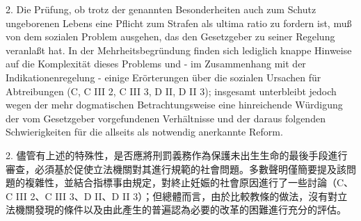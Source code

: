 \documentclass[12pt]{article}
\begin{document}
\syncleft
\begin{sourcepara}
2. Die Prüfung, ob trotz der genannten Besonderheiten auch zum Schutz ungeborenen Lebens eine Pflicht zum Strafen als ultima ratio zu fordern ist, muß von dem sozialen Problem ausgehen, das den Gesetzgeber zu seiner Regelung veranlaßt hat. In der Mehrheitsbegründung finden sich lediglich knappe Hinweise auf die Komplexität dieses Problems und - im Zusammenhang mit der Indikationenregelung - einige Erörterungen über die sozialen Ursachen für Abtreibungen (C, C III 2, C III 3, D II, D II 3); insgesamt unterbleibt jedoch wegen der mehr dogmatischen Betrachtungsweise eine hinreichende Würdigung der vom Gesetzgeber vorgefundenen Verhältnisse und der daraus folgenden Schwierigkeiten für die allseits als notwendig anerkannte Reform.
\end{sourcepara}
\begin{transpara}
2. 儘管有上述的特殊性，是否應將刑罰義務作為保護未出生生命的最後手段進行審查，必須基於促使立法機關對其進行規範的社會問題。多數聲明僅簡要提及該問題的複雜性，並結合指標事由規定，對終止妊娠的社會原因進行了一些討論（C、C III 2、C III 3、D II、D II 3）；但總體而言，由於比較教條的做法，沒有對立法機關發現的條件以及由此產生的普遍認為必要的改革的困難進行充分的評估。
\end{transpara}
\end{document}
